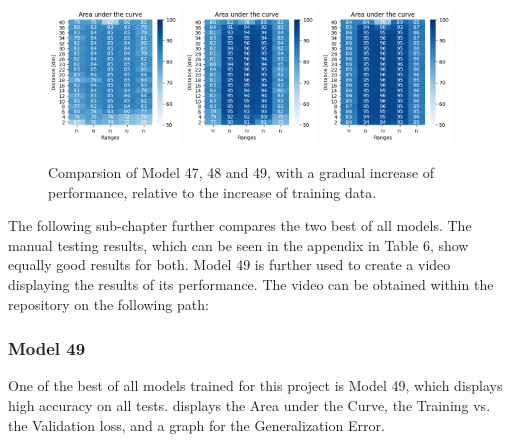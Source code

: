 \begin{figure}[H]%
\centering
\includegraphics[width=0.31\textwidth]{4_plots/plots_47/AUC_47.png}
\hspace{0.2 cm}
\includegraphics[width=0.31\textwidth]{4_plots/plots_48/AUC_48.png}
\hspace{0.2 cm}
\includegraphics[width=0.31\textwidth]{4_plots/plots_49/AUC_49.png}
\caption[]{Comparsion of Model 47, 48 and 49, with a gradual increase of performance, relative to the increase of training data.}
\label{final_set_1}
\end{figure}

The following sub-chapter further compares the two best of all models. The manual testing results, which can be seen in the appendix in Table 6, show equally good results for both. Model 49 is further used to create a video displaying the results of its performance. The video can be obtained within the repository on the following path:

\subsubsection{Model 49 \label{model_49}}
One of the best of all models trained for this project is Model 49, which displays high accuracy on all tests.  displays the Area under the Curve, the Training vs. the Validation loss, and a graph for the Generalization Error.\\

